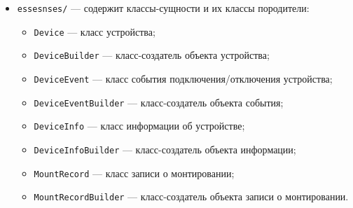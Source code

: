 \begin{itemize}[label=---]
\begin{itemize}[label=---]
\begin{itemize}[label=---]
            \item \texttt{DeviceControlService} --- класс управляет обработкой события;
            \item \texttt{EventLoop} --- класс, отправляющий события из очереди на обработку;
            \item \texttt{EventQueue} --- класс, управляющий состоянием очереди событий;
            \item \texttt{IDeviceResolver} --- интерфейс класса получения параметров устройств и монтирования;
            \item \texttt{IMountSystem} --- интерфейс класса операций монтирования/размонтирования;
            \item \texttt{LinuxMountSystem} --- класс операций монтирования/размонтирования;
            \item \texttt{MountRecoveryService} --- класс обновления записей о монтировании при запуске приложения;
            \item \texttt{MountService} --- класс, управляющий операциями монтирования;
            \item \texttt{MountUtils} --- класс-обёртка над операциями монтирования/размонтирования;
            \item \texttt{UdevDeviceResolver} --- класс получения параметров устройств и монтирования;
            \item \texttt{UdevWatcher} --- класс, отслеживающий события с устройствами.
        \end{itemize}
        \item \texttt{essesnses/} --- содержит классы-сущности и их классы породители:
        \begin{itemize}[label=---]
            \item \texttt{Device} --- класс устройства;
            \item \texttt{DeviceBuilder} --- класс-создатель объекта устройства;
            \item \texttt{DeviceEvent} --- класс события подключения/отключения устройства;
            \item \texttt{DeviceEventBuilder} --- класс-создатель объекта события;
            \item \texttt{DeviceInfo} --- класс информации об устройстве;
            \item \texttt{DeviceInfoBuilder} --- класс-создатель объекта информации;
            \item \texttt{MountRecord} --- класс записи о монтировании;
            \item \texttt{MountRecordBuilder} --- класс-создатель объекта записи о монтировании.

\end{itemize}
\end{itemize}
\end{itemize}
